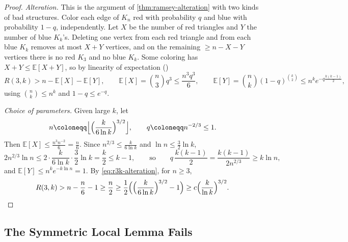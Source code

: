 \begin{proof}
    \emph{Alteration.} This is the argument of \autoref{thm:ramsey-alteration} with two kinds of bad structures. Color each edge of \(K_{n}\) red with probability \(q\) and blue with probability \(1 - q\), independently. Let \(X\) be the number of red triangles and \(Y\) the number of blue \(K_{k}\)'s. Deleting one vertex from each red triangle and from each blue \(K_{k}\) removes at most \(X + Y\) vertices, and on the remaining \(\ge n - X - Y\) vertices there is no red \(K_{3}\) and no blue \(K_{k}\). Some coloring has \(X + Y \le \mathbb{E}[X + Y]\), so by linearity of expectation ()
    \begin{equation}\label{eq:r3k-alteration}
        R(3,k) > n - \mathbb{E}[X] - \mathbb{E}[Y],
        \qquad
        \mathbb{E}[X] = \binom{n}{3} q^{3} \le \frac{n^{3} q^{3}}{6},
        \qquad
        \mathbb{E}[Y] = \binom{n}{k} (1-q)^{\binom{k}{2}} \le n^{k} e^{-q \frac{k(k-1)}{2}} ,
    \end{equation}
    using \(\binom{n}{k} \le n^{k}\) and \(1 - q \le e^{-q}\).

    \emph{Choice of parameters.} Given large \(k\), let
    \[
        n \coloneqq \Bigl\lfloor \Bigl( \frac{k}{6 \ln k} \Bigr)^{3/2} \Bigr\rfloor,
        \qquad
        q \coloneqq n^{-2/3} \le 1 .
    \]
    Then \(\mathbb{E}[X] \le \frac{n^{3} n^{-2}}{6} = \frac{n}{6}\). Since \(n^{2/3} \le \frac{k}{6 \ln k}\) and \(\ln n \le \frac{3}{2} \ln k\),
    \[
        2 n^{2/3} \ln n \le 2 \cdot \frac{k}{6 \ln k} \cdot \frac{3}{2} \ln k = \frac{k}{2} \le k - 1,
        \qquad\text{so}\qquad
        q \, \frac{k(k-1)}{2} = \frac{k (k-1)}{2 n^{2/3}} \ge k \ln n ,
    \]
    and \(\mathbb{E}[Y] \le n^{k} e^{-k \ln n} = 1\). By \eqref{eq:r3k-alteration}, for \(n \ge 3\),
    \[
        R(3,k) > n - \frac{n}{6} - 1 \ge \frac{n}{2} \ge \frac{1}{2} \Bigl( \Bigl( \frac{k}{6 \ln k} \Bigr)^{3/2} - 1 \Bigr) \ge c \Bigl( \frac{k}{\ln k} \Bigr)^{3/2} . \qedhere
    \]
\end{proof}

\subsection{The Symmetric Local Lemma Fails}\label{sec:r3k-symmetric}

